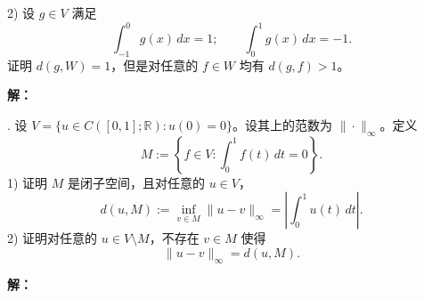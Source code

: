 \documentclass{article}
\begin{document}
2) 设 $g\in V$ 满足
\[
\int_{-1}^0 g(x)\,dx=1;\qquad \int_0^1 g(x)\,dx=-1.
\]
证明 $d(g,W)=1$，但是对任意的 $f\in W$ 均有 $d(g,f)>1$。


\par\nopagebreak[4]\noindent\textbf{解：}



\par\medskip

\par\medskip{}. 设 $V=\{u\in C([0,1];\mathbb R):u(0)=0\}$。设其上的范数为 $\|\cdot\|_\infty$。定义
\[
M:=\left\{f\in V:\int_0^1 f(t)\,dt=0\right\}.
\]
1) 证明 $M$ 是闭子空间，且对任意的 $u\in V$，
\[
d(u,M):=\inf_{v\in M}\|u-v\|_\infty=\left|\int_0^1u(t)\,dt\right|.
\]
2) 证明对任意的 $u\in V\setminus M$，不存在 $v\in M$ 使得
\[
\|u-v\|_\infty=d(u,M).
\]


\par\nopagebreak[4]\noindent\textbf{解：}



\par\medskip
\end{document}
